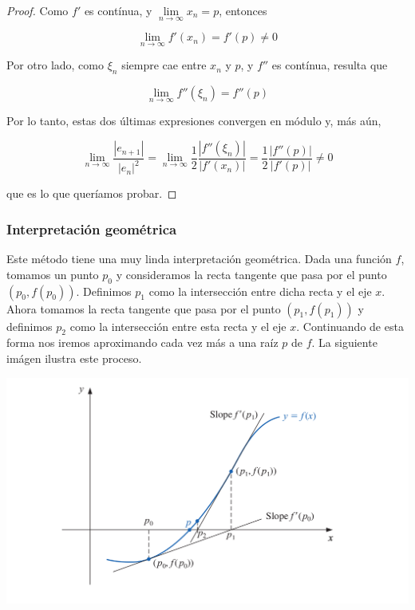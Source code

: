 \begin{propo}
\begin{proof}
Como $f'$ es contínua, y $\lim\limits_{n \to \infty} x_n = p$, entonces

\[\lim\limits_{n \to \infty} f'(x_n) = f'(p) \neq 0\]

Por otro lado, como $\xi_n$ siempre cae entre $x_n$ y $p$, y $f''$ es contínua, resulta que

\[\lim\limits_{n \to \infty} f''(\xi_n) = f''(p)\]

Por lo tanto, estas dos últimas expresiones convergen en módulo y, más aún,

\[\lim\limits_{n \to \infty} \frac{|e_{n + 1}|}{|e_n|^2} = \lim\limits_{n \to \infty} \frac{1}{2}\frac{|f''(\xi_n)|}{|f'(x_n)|} = \frac{1}{2}\frac{|f''(p)|}{|f'(p)|} \neq 0\]

que es lo que queríamos probar.

\end{proof}
\end{propo}

\subsubsection{Interpretación geométrica}

Este método tiene una muy linda interpretación geométrica. Dada una función $f$, tomamos un punto $p_0$ y consideramos la recta tangente que pasa por el punto $(p_0, f(p_0))$. Definimos $p_1$ como la intersección entre dicha recta y el eje $x$. Ahora tomamos la recta tangente que pasa por el punto $(p_1, f(p_1))$ y definimos $p_2$ como la intersección entre esta recta y el eje $x$. Continuando de esta forma nos iremos aproximando cada vez más a una raíz $p$ de $f$. La siguiente imágen ilustra este proceso.

\begin{center}
	\includegraphics[scale = 0.27]{imagenes/newton.png}~\\[0.25cm]
\end{center}

